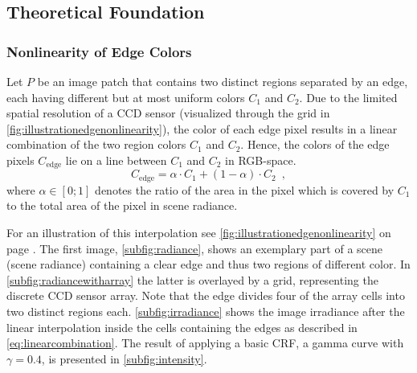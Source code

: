 \subsection{Theoretical Foundation}
\label{subsec:radcaltheory}

\subsubsection{Nonlinearity of Edge Colors}
\label{subsubsec:nonlinearityofedgecolors}
Let $P$ be an image patch that contains two distinct regions separated by an edge, each having different but at most uniform colors $C_1$ and $C_2$. Due to the limited spatial resolution of a CCD sensor (visualized through the grid in \autoref{fig:illustrationedgenonlinearity}), the color of each edge pixel results in a linear combination of the two region colors $C_1$ and $C_2$. Hence, the colors of the edge pixels $C_{\text{edge}}$ lie on a line between $C_1$ and $C_2$ in RGB-space.
\begin{equation}
	C_{\text{edge}} = \alpha \cdot C_1 + (1 - \alpha) \cdot C_2 \enspace , 
	\label{eq:linearcombination}
\end{equation}
where $\alpha \in [0;1]$ denotes the ratio of the area in the pixel which is covered by $C_1$ to the total area of the pixel in scene radiance.

For an illustration of this interpolation see \autoref{fig:illustrationedgenonlinearity} on page \pageref{fig:illustrationedgenonlinearity}. The first image, \autoref{subfig:radiance}, shows an exemplary part of a scene (scene radiance) containing a clear edge and thus two regions of different color. In \autoref{subfig:radiancewitharray} the latter is overlayed by a grid, representing the discrete CCD sensor array. Note that the edge divides four of the array cells into two distinct regions each. \autoref{subfig:irradiance} shows the image irradiance after the linear interpolation inside the cells containing the edges as described in \autoref{eq:linearcombination}. The result of applying a basic CRF, a gamma curve with $\gamma = 0.4$, is presented in \autoref{subfig:intensity}.

